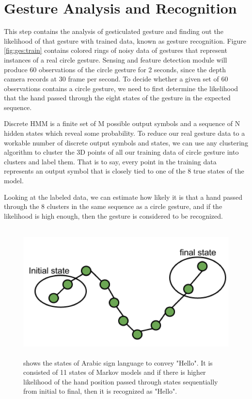 \section{Gesture Analysis and Recognition}
This step contains the analysis of gesticulated gesture and finding out the likelihood of that gesture with trained data, known as gesture recognition. Figure \ref{fig:ges:train}  contains colored rings of noisy data of gestures that represent instances of a real circle gesture. Sensing and feature detection module will produce 60 observations of the circle gesture for 2 seconds, since the depth camera records at 30 frame per second. To decide whether a given set of 60 observations contains a circle gesture, we need to first determine the likelihood that the hand passed through the eight states of the gesture in the expected sequence.

Discrete HMM is a finite set of M possible output symbols and a sequence of N hidden states which reveal some probability. To reduce our real gesture data to a workable number of discrete output symbols and states, we can use any clustering algorithm to cluster the 3D points of all our training data of circle gesture into clusters and label them. That is to say, every point in the training data represents an output symbol that is closely tied to one of the 8 true states of the model.

Looking at the labeled data, we can estimate how likely it is that a hand passed through the 8 clusters in the same sequence as a circle gesture, and if the likelihood is high enough, then the gesture is considered to be recognized.

\begin{figure}
	[h] \centering 
	\includegraphics[height=7cm]{figures/ges-rec.png} \caption{shows the states of Arabic sign language to convey "Hello". It is consisted of 11 states of Markov models and if there is higher likelihood of the hand position passed through states sequentially from initial to final, then it is recognized as "Hello".} \label{fig:ges:reg} 
\end{figure}

